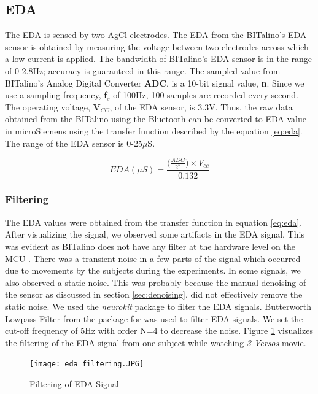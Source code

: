 \subsection{EDA}
\label{sec:eda_feature_extraction}
The EDA is sensed by two AgCl electrodes. The EDA from the BITalino's EDA sensor is obtained by measuring the voltage between two electrodes across which a low current is applied. The bandwidth of BITalino's EDA sensor is in the range of 0-2.8Hz; accuracy is guaranteed in this range. The sampled value from BITalino's Analog Digital Converter \textbf{ADC}, is a 10-bit signal value, \textbf{n}. Since we use a sampling frequency, \textbf{f$_{s}$} of 100Hz, 100 samples are recorded every second. The operating voltage, \textbf{V$_{CC}$}, of the EDA sensor, is 3.3V. Thus, the raw data obtained from the BITalino using the Bluetooth can be converted to EDA value in microSiemens using the transfer function described by the equation \ref{eq:eda}. The range of the EDA sensor is 0-25$\mu$S. 


\begin{equation}
\label{eq:eda}
    EDA(\mu S) = \frac{\big(\frac{ADC}{2^n}) \times V_{cc}}{0.132}
\end{equation}

\subsubsection{Filtering} The EDA values were obtained from the transfer function in equation \ref{eq:eda}. After visualizing the signal, we observed some artifacts in the EDA signal. This was evident as BITalino does not have any filter at the hardware level on the MCU \cite{noauthor_faq_nodate}. There was a transient noise in a few parts of the signal which occurred due to movements by the subjects during the experiments. In some signals, we also observed a static noise. This was probably because the manual denoising of the sensor as discussed in section \ref{sec:denoising}, did not effectively remove the static noise. We used the \textit{neurokit} \cite{noauthor_python_2019} package to filter the EDA signals. Butterworth Lowpass Filter from the package for was used to filter EDA signals. We set the cut-off frequency of 5Hz with order N=4 to decrease the noise. Figure \ref{fig:eda_filtering_} visualizes the filtering of the EDA signal from one subject while watching \textit{3 Versos} movie.

\begin{figure}
    \centering
    \texttt{[image: eda\_filtering.JPG]}
    \caption{Filtering of EDA Signal}
    \label{fig:eda_filtering_}
\end{figure}

